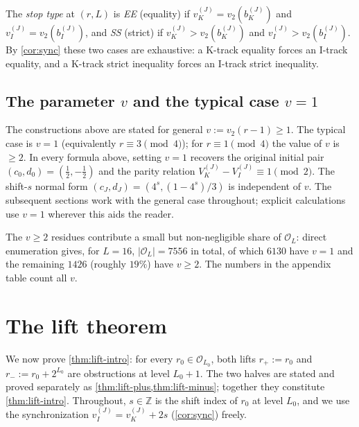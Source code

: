 \documentclass[11pt,reqno]{amsart}
\newcommand{\Z}{\mathbb{Z}}
\newcommand{\Obs}{\mathcal{O}}
\newcommand{\Vk}{V_{K}}
\newcommand{\Vi}{V_{I}}
\newcommand{\vk}{v_{K}}
\newcommand{\vi}{v_{I}}
\newcommand{\vtwo}{v_{2}}
\begin{document}
\begin{definition}\label{def:stop-type}
The \emph{stop type} at $(r, L)$ is \emph{EE} (equality) if
$\vk^{(J)} = \vtwo(b_K^{(J)})$ and $\vi^{(J)} = \vtwo(b_I^{(J)})$, and
\emph{SS} (strict) if $\vk^{(J)} > \vtwo(b_K^{(J)})$ and
$\vi^{(J)} > \vtwo(b_I^{(J)})$. By \cref{cor:sync} these two
cases are exhaustive: a K-track equality forces an I-track equality,
and a K-track strict inequality forces an I-track strict inequality.
\end{definition}

\subsection{The parameter \texorpdfstring{$v$}{v} and the typical case \texorpdfstring{$v = 1$}{v = 1}}

The constructions above are stated for general $v := \vtwo(r-1) \ge 1$. The
typical case is $v = 1$ (equivalently $r \equiv 3 \pmod 4$); for $r \equiv 1
\pmod 4$ the value of $v$ is $\ge 2$. In every formula above, setting $v = 1$
recovers the original initial pair $(c_0, d_0) = (\tfrac{1}{2}, -\tfrac{1}{2})$
and the parity relation $\Vk^{(J)} - \Vi^{(J)} \equiv 1 \pmod 2$. The
shift-$s$ normal form $(c_J, d_J) = (4^s, (1-4^s)/3)$ is independent of $v$.
The subsequent sections work with the general case throughout; explicit
calculations use $v = 1$ wherever this aids the reader.

The $v \ge 2$ residues contribute a small but non-negligible share of
$\Obs_L$: direct enumeration gives, for $L = 16$, $|\Obs_L| = 7556$ in
total, of which $6130$ have $v = 1$ and the remaining $1426$ (roughly
$19\%$) have $v \ge 2$. The numbers in the appendix table count all $v$.

\section{The lift theorem}
\label{sec:lift}

We now prove \cref{thm:lift-intro}: for every $r_0 \in \Obs_{L_0}$,
both lifts $r_+ := r_0$ and $r_- := r_0 + 2^{L_0}$ are obstructions at level
$L_0 + 1$. The two halves are stated and proved separately as
\cref{thm:lift-plus,thm:lift-minus}; together they
constitute \cref{thm:lift-intro}. Throughout, $s \in \Z$ is the
shift index of $r_0$ at level $L_0$, and we use the synchronization
$\vi^{(J)} = \vk^{(J)} + 2s$ (\cref{cor:sync}) freely.
\end{document}
